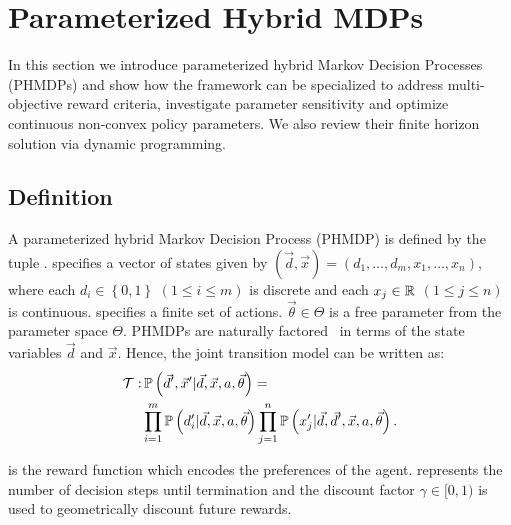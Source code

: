 \section{Parameterized Hybrid MDPs}
\label{sec:hybrid_mdps}

In this section we introduce parameterized hybrid Markov Decision
Processes (PHMDPs) and show how the framework can be specialized to
address multi-objective reward criteria, investigate parameter
sensitivity and optimize continuous non-convex policy parameters. We
also review their finite horizon solution via dynamic programming.

\subsection{Definition}
\label{sec:hybrid_mdps_def}

A parameterized hybrid Markov Decision Process (PHMDP) is defined by the tuple {\footnotesize \PMDPTuple}. {\footnotesize \State} specifies
a vector of states given by {\footnotesize $(\vec{d}, \vec{x}) =  \left( d_1, \ldots, d_m, x_1, \ldots, x_n \right) $}, where each {\footnotesize $ d_i \in \left\lbrace 0, 1 \right\rbrace $} {\footnotesize $\left( 1 \leq i \leq m \right)$} is discrete and each
{\footnotesize$ x_j \in \mathbb{R} $} {\footnotesize $\left( 1 \leq j \leq   n \right)$} is continuous. {\footnotesize \Action} specifies a
finite set of actions.  {\footnotesize $\vec{\theta} \in \Theta$} is a free parameter from the parameter space {\footnotesize $ \Theta $}. PHMDPs are naturally factored~\parencite{Boutilier_JAIR_1999} in terms of the state variables {\footnotesize$\vec{d}$} and {\footnotesize
$\vec{x}$}. Hence, the joint transition model can be written as:
{\footnotesize
\abovedisplayskip=0pt
\belowdisplayskip=0pt
\begin{align}
    \label{eq:hmdp_tfunc}
    \mathcal{T} :& \, \mathbb{P}\left({\vec{d}', \vec{x}' | \vec{d}, \vec{x}, a, \vec{\theta}}\right) = \nonumber \\
    & \prod_{i=1}^{m} \mathbb{P}\left({d_i' | \vec{d}, \vec{x}, a, \vec{\theta}}\right) \prod_{j=1}^{n} \mathbb{P}\left({x_j' | \vec{d}, \vec{d}', \vec{x}, a, \vec{\theta}}\right).
\end{align}   
}

{\footnotesize \RewardFunc} is the reward function which encodes the preferences of the agent. {\footnotesize \Horizon} represents the
number of decision steps until termination and the discount factor {\footnotesize $\gamma \in [0, 1)$} is used to geometrically discount
future rewards.

